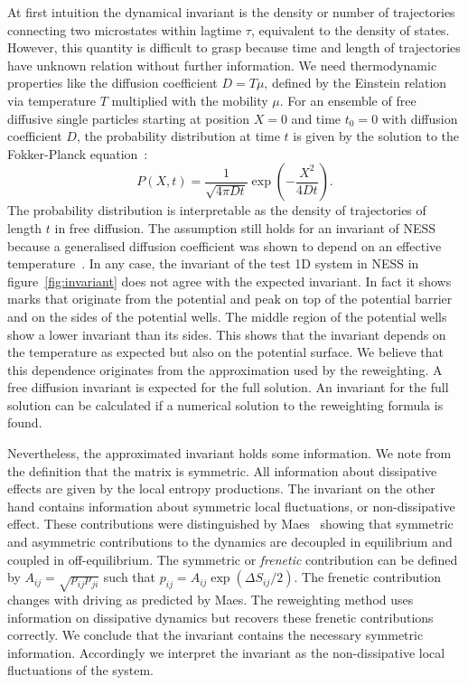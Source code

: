 At first intuition the dynamical invariant is the density or number of trajectories connecting two microstates within lagtime $\tau$, equivalent to the density of states. However, this quantity is difficult to grasp because time and  length of trajectories have unknown relation without further information. We need thermodynamic properties like the diffusion coefficient $D = T\mu$, defined by the Einstein relation via temperature $T$ multiplied with the mobility $\mu$. For an ensemble of free diffusive single particles starting at position $X=0$ and time $t_0=0$ with diffusion coefficient $D$, the probability distribution at time $t$ is given by the solution to the Fokker-Planck equation~\cite{van1992stochastic}:
\begin{equation}
 P(X,t) = \frac{1}{\sqrt{4 \pi D t}} \exp \left (- \frac{X^2}{4Dt} \right ).
\end{equation}
The probability distribution is interpretable as the density of trajectories of length $t$ in free diffusion. The assumption  still holds for an invariant of NESS because a generalised diffusion coefficient was shown to depend on an effective temperature~\cite{lander2011mobility}. In any case, the invariant of the test 1D system in NESS in figure~\ref{fig:invariant} does not agree with the expected invariant. In fact it shows marks that originate from the potential and peak on top of the potential barrier and on the sides of the potential wells. The middle region of the potential wells show a lower invariant than its sides. This shows that the invariant depends on the temperature as expected but also on the potential surface. We believe that this dependence originates from the approximation used by the reweighting. A free diffusion invariant is expected for the full solution. An invariant for the full solution can be calculated if a numerical solution to the reweighting formula is found.


Nevertheless, the approximated invariant holds some information. We note from the definition that the matrix is symmetric. All information about dissipative effects are given by the local entropy productions.  The invariant on the other hand contains information about symmetric local fluctuations, or non-dissipative effect. These contributions were distinguished by Maes~\cite{maes2018non} showing that symmetric and asymmetric contributions to the dynamics are decoupled in equilibrium and coupled in off-equilibrium. The symmetric or \textit{frenetic} contribution can be defined by $A_{ij} = \sqrt{p_{ij}p_{ji}}$ such that $p_{ij}= A_{ij} \exp \left( \Delta S_{ij} /2 \right )$. The frenetic contribution changes with driving as predicted by Maes. The reweighting method uses information on dissipative dynamics but recovers these frenetic contributions correctly. We conclude that the invariant contains the necessary symmetric information. Accordingly we interpret the invariant as the non-dissipative local fluctuations of the system. 

